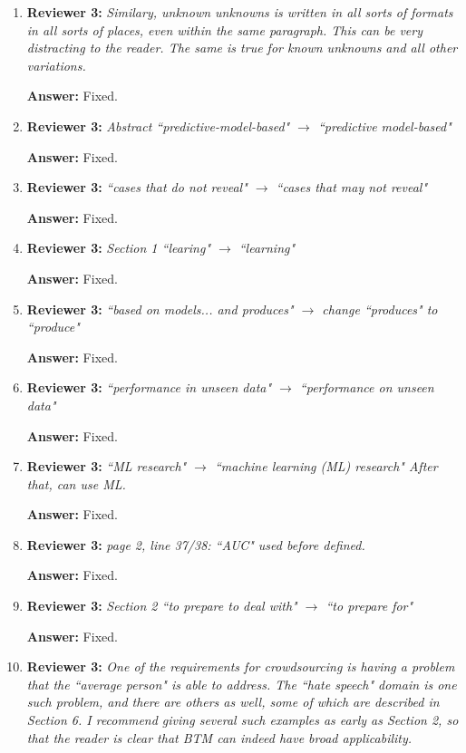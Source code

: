 \documentclass[letterpaper]{article}
\begin{document}
\begin{enumerate}
\item \textbf{Reviewer 3:} \emph{ Similary, unknown unknowns is written in all sorts of formats in all sorts of places, even within the same paragraph.  This can be very distracting to the reader.  The same is true for known unknowns and all other variations.}

\textbf{Answer:} Fixed.

\item \textbf{Reviewer 3:} \emph{ Abstract ``predictive-model-based" $\rightarrow$ ``predictive model-based"}

\textbf{Answer:} Fixed.

\item \textbf{Reviewer 3:} \emph{ ``cases that do not reveal" $\rightarrow$ ``cases that may not reveal"}

\textbf{Answer:} Fixed.

\item \textbf{Reviewer 3:} \emph{ Section 1 ``learing" $\rightarrow$ ``learning"}

\textbf{Answer:} Fixed.

\item \textbf{Reviewer 3:} \emph{ ``based on models... and produces" $\rightarrow$ change ``produces" to ``produce"}

\textbf{Answer:} Fixed.

\item \textbf{Reviewer 3:} \emph{ ``performance in unseen data" $\rightarrow$ ``performance on unseen data"}

\textbf{Answer:} Fixed.

\item \textbf{Reviewer 3:} \emph{ ``ML research" $\rightarrow$ ``machine learning (ML) research" After that, can use ML.}

\textbf{Answer:} Fixed.

\item \textbf{Reviewer 3:} \emph{ page 2, line 37/38: ``AUC" used before defined.}

\textbf{Answer:} Fixed.

\item \textbf{Reviewer 3:} \emph{Section 2 ``to prepare to deal with" $\rightarrow$ ``to prepare for"}

\textbf{Answer:} Fixed.

\item \textbf{Reviewer 3:} \emph{ One of the requirements for crowdsourcing is having a problem that the ``average person" is able to address.  The ``hate speech" domain is one such problem, and there are others as well, some of which are described in Section 6. I recommend giving several such examples as early as Section 2, so that the reader is clear that BTM can indeed have broad applicability.}


\end{enumerate}
\end{document}
